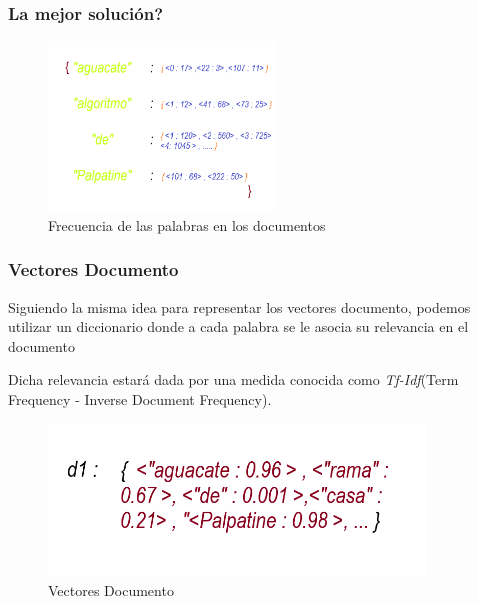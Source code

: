 \documentclass{beamer}
\begin{document}
\begin{frame}
    \frametitle{La mejor solución?}
    
    \begin{figure}
        \includegraphics[width = 6cm]{./../images/content.png}
        \caption{Frecuencia de las palabras en los documentos}
    
    \end{figure}
\end{frame}
    
\begin{frame}
    \frametitle{Vectores Documento}
    Siguiendo la misma idea para representar los vectores documento, podemos utilizar un diccionario donde a cada palabra
    se le asocia su relevancia en el documento

    Dicha relevancia estará dada por una medida conocida como \textit{Tf-Idf}(Term Frequency - Inverse Document Frequency).
\end{frame}

\begin{frame}
    \begin{figure}
        \includegraphics[width = 10cm]{./../images/tfidf.png}
        \caption{Vectores Documento}
    \end{figure}
        
\end{frame}
\end{document}
